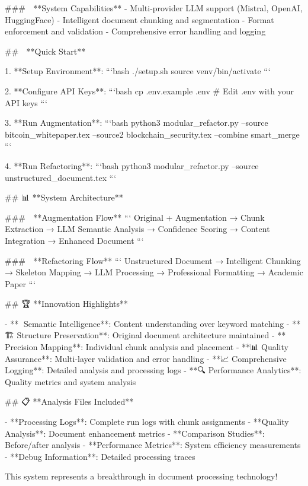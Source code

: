 ### 🔧 **System Capabilities**
- Multi-provider LLM support (Mistral, OpenAI, HuggingFace)
- Intelligent document chunking and segmentation
- Format enforcement and validation
- Comprehensive error handling and logging

## 🚀 **Quick Start**

1. **Setup Environment**:
   ```bash
   ./setup.sh
   source venv/bin/activate
   ```

2. **Configure API Keys**:
   ```bash
   cp .env.example .env
   # Edit .env with your API keys
   ```

3. **Run Augmentation**:
   ```bash
   python3 modular_refactor.py --source bitcoin_whitepaper.tex --source2 blockchain_security.tex --combine smart_merge
   ```

4. **Run Refactoring**:
   ```bash
   python3 modular_refactor.py --source unstructured_document.tex
   ```

## 📊 **System Architecture**

### 🚀 **Augmentation Flow**
```
Original + Augmentation → Chunk Extraction → LLM Semantic Analysis → Confidence Scoring → Content Integration → Enhanced Document
```

### 🔧 **Refactoring Flow**  
```
Unstructured Document → Intelligent Chunking → Skeleton Mapping → LLM Processing → Professional Formatting → Academic Paper
```

## 🏆 **Innovation Highlights**

- **🧠 Semantic Intelligence**: Content understanding over keyword matching
- **🏗️ Structure Preservation**: Original document architecture maintained
- **🎯 Precision Mapping**: Individual chunk analysis and placement
- **📊 Quality Assurance**: Multi-layer validation and error handling
- **📈 Comprehensive Logging**: Detailed analysis and processing logs
- **🔍 Performance Analytics**: Quality metrics and system analysis

## 📋 **Analysis Files Included**

- **Processing Logs**: Complete run logs with chunk assignments
- **Quality Analysis**: Document enhancement metrics
- **Comparison Studies**: Before/after analysis
- **Performance Metrics**: System efficiency measurements
- **Debug Information**: Detailed processing traces

This system represents a breakthrough in document processing technology! 🌟